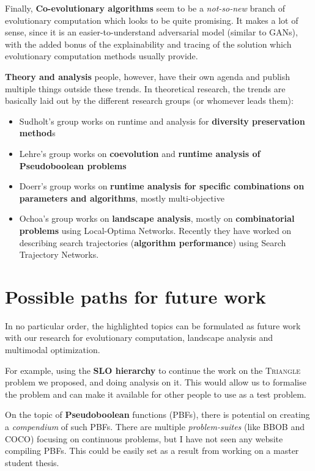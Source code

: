 \documentclass[11pt, letterpaper, oneside]{article}
\begin{document}
Finally, \textbf{Co-evolutionary algorithms} seem to be a \textit{not-so-new} branch of evolutionary computation which looks to be quite promising.
It makes a lot of sense, since it is an easier-to-understand adversarial model (similar to GANs), with the added bonus of the explainability and tracing of the solution which evolutionary computation methods usually provide.

\textbf{Theory and analysis} people, however, have their own agenda and publish multiple things outside these trends.
In theoretical research, the trends are basically laid out by the different research groups (or whomever leads them):
\begin{itemize}
    \item Sudholt's group works on runtime and analysis for \textbf{diversity preservation method}s
    \item Lehre's group works on \textbf{coevolution} and \textbf{runtime analysis of Pseudoboolean problems}
    \item Doerr's group works on \textbf{runtime analysis for specific combinations on parameters and algorithms}, mostly multi-objective
    \item Ochoa's group works on \textbf{landscape analysis}, mostly on \textbf{combinatorial problems} using Local-Optima Networks. Recently they have worked on describing search trajectories (\textbf{algorithm performance}) using Search Trajectory Networks.
\end{itemize}

\section{Possible paths for future work}

In no particular order, the highlighted topics can be formulated as future work with our research for evolutionary computation, landscape analysis and multimodal optimization.

For example, using the \textbf{SLO hierarchy} to continue the work on the \textsc{Triangle} problem we proposed, and doing analysis on it.
This would allow us to formalise the problem and can make it available for other people to use as a test problem.

On the topic of \textbf{Pseudoboolean} functions (PBFs), there is potential on creating a \textit{compendium} of such PBFs.
There are multiple \textit{problem-suites} (like BBOB and COCO) focusing on continuous problems, but I have not seen any website compiling PBFs.
This could be easily set as a result from working on a master student thesis.
\end{document}
